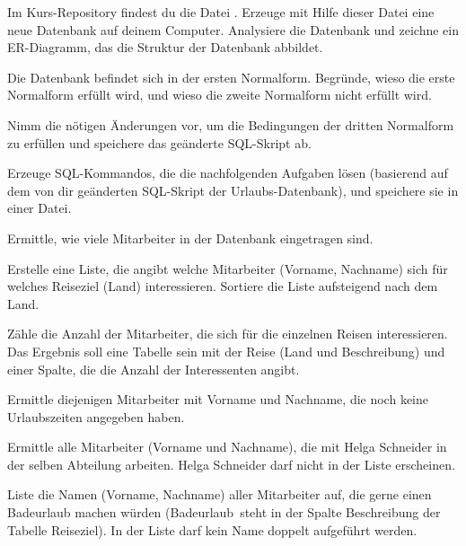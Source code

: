 \begin{compactenum}[a)]

\item Im Kurs-Repository findest du die Datei .
Erzeuge mit Hilfe dieser Datei eine neue Datenbank auf deinem Computer.
Analysiere die Datenbank und zeichne ein ER-Diagramm, das die Struktur der
Datenbank abbildet.

\item Die Datenbank befindet sich in der ersten Normalform. Begründe, wieso die
 erste Normalform erfüllt wird, und wieso die zweite Normalform nicht erfüllt wird.

\item Nimm die nötigen Änderungen vor, um die Bedingungen der dritten
Normalform zu erfüllen und speichere das geänderte SQL-Skript ab.

\item Erzeuge SQL-Kommandos, die die nachfolgenden Aufgaben lösen (basierend
auf dem von dir geänderten SQL-Skript der Urlaubs-Datenbank), und speichere sie
in einer Datei.

\begin{compactenum}[1.]
\item Ermittle, wie viele Mitarbeiter in der Datenbank eingetragen sind.

\item Erstelle eine Liste, die angibt welche Mitarbeiter (Vorname, Nachname)
sich für welches Reiseziel (Land) interessieren. Sortiere die Liste aufsteigend
nach dem Land.

\item Zähle die Anzahl der Mitarbeiter, die sich für die einzelnen Reisen
interessieren. Das Ergebnis soll eine Tabelle sein mit der Reise (Land und
Beschreibung) und einer Spalte, die die Anzahl der Interessenten angibt.

\item Ermittle diejenigen Mitarbeiter mit Vorname und Nachname, die noch keine
Urlaubszeiten angegeben haben.

\item Ermittle alle Mitarbeiter (Vorname und Nachname), die mit Helga Schneider
in der selben Abteilung arbeiten. Helga Schneider darf nicht in der Liste
erscheinen.

\item Liste die Namen (Vorname, Nachname) aller Mitarbeiter auf, die gerne einen
Badeurlaub machen würden (\glqq Badeurlaub\grqq\ steht in der Spalte
Beschreibung der Tabelle Reiseziel). In der Liste darf kein Name doppelt
aufgeführt werden.


\end{compactenum}
\end{compactenum}
